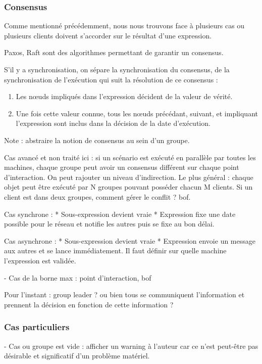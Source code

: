 \documentclass{article}
\newcommand\trigger{point d'interaction\xspace}
\begin{document}
\subsubsection{Consensus}\label{section.consensus}
Comme mentionné précédemment, nous nous trouvons face à plusieurs cas 
ou plusieurs clients doivent s'accorder sur le résultat d'une expression.

Paxos, Raft sont des algorithmes permettant de garantir un consensus.%

S'il y a synchronisation, on sépare la synchronisation du consensus, de la synchronisation de l'exécution qui suit la résolution de ce consensus : 
\begin{enumerate}
    \item Les nœuds impliqués dans l'expression décident de la valeur de vérité.
    \item Une fois cette valeur connue, tous les nœuds précédant, suivant, et impliquant l'expression sont inclus dans la décision de la date d'exécution.
\end{enumerate}

Note : abstraire la notion de consensus au sein d'un groupe.

Cas avancé et non traité ici : si un scénario est exécuté en parallèle par toutes les machines, chaque groupe peut avoir un consensus différent sur chaque \trigger.
On peut rajouter un niveau d'indirection. Le plus général : chaque objet peut être exécuté par N groupes pouvant posséder chacun M clients.
Si un client est dans deux groupes, comment gérer le conflit ? bof.


Cas synchrone : 
* Sous-expression devient vraie
* Expression fixe une date possible pour le réseau et notifie les autres puis se fixe au bon délai.

Cas asynchrone : 
* Sous-expression devient vraie
* Expression envoie un message aux autres et se lance immédiatement.
Il faut définir sur quelle machine l'expression est validée.

- Cas de la borne max : \trigger, bof

Pour l'instant : group leader ? ou bien tous se communiquent l'information et prennent la décision en fonction de cette information ?


\subsubsection{Cas particuliers}
- Cas ou groupe est vide : afficher un warning à l'auteur car ce n'est peut-être pas désirable et significatif d'un problème matériel.
\end{document}
